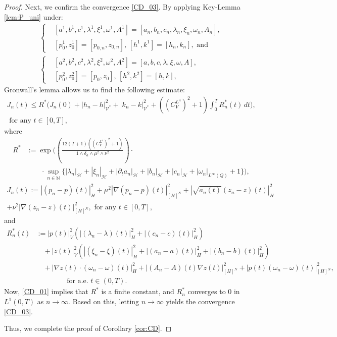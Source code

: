 \documentclass{sinst}
\numberwithin{equation}{section}
\theoremstyle{plain}
\theoremstyle{definition}
\def\N{\mathbb{N}}
\def\sH{\mathscr{H}}
\def\sV{\mathscr{V}}
\begin{document}
\begin{proof}
  Next, we confirm the convergence \eqref{CD_03}. By applying Key-Lemma \ref{lem:P_uni} under:
  \begin{gather}
    \left\{ \begin{aligned}
      &[a^1, b^1, c^1, \lambda^1, \xi^1, \omega^1, A^1] = [a_n, b_n, c_n, \lambda_n, \xi_n, \omega_n, A_n],
      \\
      &[p_0^1, z_0^1] = [p_{0,n}, z_{0,n}], \, [h^1, k^1] = [h_n, k_n], \mbox{ and }
    \end{aligned} \right.
    \\
    \left\{ \begin{aligned}
      &[a^2, b^2, c^2, \lambda^2, \xi^2, \omega^2, A^2] = [a, b, c, \lambda, \xi, \omega, A],
      \\
      &[p_0^2, z_0^2] = [p_0, z_0], \, [h^2, k^2] = [h, k],
    \end{aligned} \right.
  \end{gather}
  Gronwall's lemma allows us to find the following estimate:
  \begin{gather}
    J_n(t) \leq R^*\biggl( J_n(0) + |h_n - h|_{\sV^*}^2 + |k_n - k|_{\sV^*}^2 + ((C_V^{L^4})^2 + 1)\int_0^T R_n^*(t)\,dt \biggr),
    \\
    \mbox{ for any } t \in [0,T], \label{CD_04}
  \end{gather}
  where
  \begin{align}
    R^* &:= \exp\Biggl( \left( \frac{12(T + 1)((C_V^{L^4})^2 + 1)}{1 \wedge \delta_a \wedge \mu^2 \wedge \nu^2} \right) \cdot 
    \\
    &\qquad \cdot \sup_{n \in \N} \bigl\{ |\lambda_n|_\sH + |\xi_n|_\sH + |\partial_t a_n|_\sH + |b_n|_\sH + |c_n|_\sH + |\omega_n|_{L^\infty(Q)} + 1 \bigr\} \Biggr), \label{CD_05}
  \end{align}
  \begin{gather}
    J_n(t) := |(p_n - p)(t)|_H^2 + \mu^2 |\nabla (p_n - p)(t)|_{[H]^N}^2 + |\sqrt{a_n(t)}(z_n - z)(t)|_H^2 
    \\
    + \nu^2 |\nabla(z_n - z)(t)|_{[H]^N}^2, \mbox{ for any } t \in [0,T], \label{CD_06}
  \end{gather}
  and
  \begin{align}
    R_n^*(t) &:= |p(t)|_V^2 (|(\lambda_n - \lambda)(t)|_H^2 + |(c_n - c)(t)|_H^2) \label{CD_07}
    \\
    &\quad + |z(t)|_V^2 (|(\xi_n - \xi)(t)|_H^2 + |(a_n - a)(t)|_H^2 + |(b_n - b)(t)|_H^2)
    \\
    &\quad + |\nabla z(t) \cdot (\omega_n - \omega)(t)|_H^2 + |(A_n - A)(t) \nabla z(t)|_{[H]^N}^2 + |p(t) (\omega_n - \omega)(t)|_{[H]^N}^2,
    \\
    &\qquad\qquad \mbox{ for a.e. } t \in (0,T). 
  \end{align}
  Now, \eqref{CD_01} implies that $R^*$ is a finite constant, and $R_n^*$ converges to $0$ in $L^1(0,T)$ as $n \to \infty$. Based on this, letting $n \to \infty$ yields the convergence \eqref{CD_03}.

  Thus, we complete the proof of Corollary \ref{cor:CD}.
\end{proof}
\end{document}
